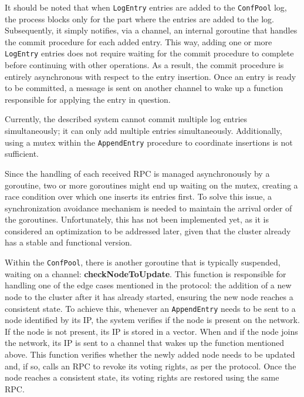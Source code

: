 \begin{itemize}
    It should be noted that when \texttt{LogEntry} entries are added to the \texttt{ConfPool} log, the process
    blocks only for the part where the entries are added to the log. Subsequently, it 
    simply notifies, via a channel, an internal goroutine that handles the commit procedure 
    for each added entry.
    This way, adding one or more \texttt{LogEntry} entries does not require waiting for the commit 
    procedure to complete before continuing with other operations. As a result, the commit
    procedure is entirely asynchronous with respect to the entry insertion.
    Once an entry is ready to be committed, a message is sent on another channel to wake up 
    a function responsible for applying the entry in question.

    Currently, the described system cannot commit multiple log entries simultaneously; 
    it can only add multiple entries simultaneously. Additionally, using a mutex within 
    the \texttt{AppendEntry} procedure to coordinate insertions is not sufficient.

    Since the handling of each received RPC is managed asynchronously by a goroutine, two 
    or more goroutines might end up waiting on the mutex, creating a race condition over 
    which one inserts its entries first.
    To solve this issue, a synchronization avoidance mechanism is needed to maintain the 
    arrival order of the goroutines. Unfortunately, this has not been implemented yet, 
    as it is considered an optimization to be addressed later, given that the cluster 
    already has a stable and functional version.

    Within the \texttt{ConfPool}, there is another goroutine that is typically suspended, waiting
    on a channel: \textbf{checkNodeToUpdate}. This function is responsible for handling one of 
    the edge cases mentioned in the protocol: the addition of a new node to the cluster 
    after it has already started, ensuring the new node reaches a consistent state.
    To achieve this, whenever an \texttt{AppendEntry} needs to be sent to a node identified by 
    its IP, the system verifies if the node is present on the network. If the node 
    is not present, its IP is stored in a vector. When and if the node joins the network, 
    its IP is sent to a channel that wakes up the function mentioned above. This 
    function verifies whether the newly added node needs to be updated and, if so, 
    calls an RPC to revoke its voting rights, as per the protocol. Once the node 
    reaches a consistent state, its voting rights are restored using the same RPC. 


\end{itemize}
